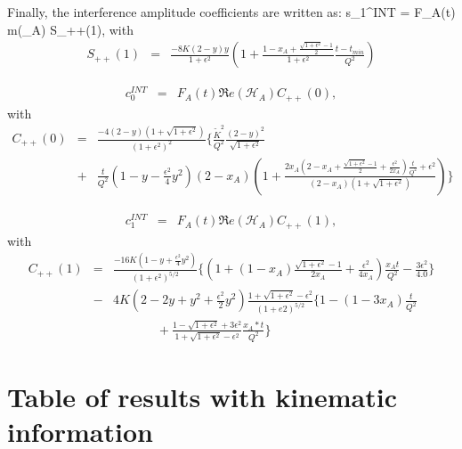 \documentclass{article}
\let\oldequation\equation
\let\oldendequation\endequation
\renewenvironment{equation}
  {\linenomathNonumbers\oldequation}
  {\oldendequation\endlinenomath}
\begin{document}
Finally, the interference amplitude coefficients are written as:
\begin{equation}
s_{1}^{INT} = F_{A}(t) \Im m(_{A}) S_{++}(1),
\end{equation}
with
\begin{eqnarray}
   S_{++}(1) &=& \frac{-8K(2-y)y}{1+\epsilon^2} \left( 1 + 
\frac{1-x_A+\frac{\sqrt{1+\epsilon^2}-1}{2}}{1+\epsilon^2} 
\frac{t-t_{min}}{Q^{2}} \right) \label{eq:s1I}
\end{eqnarray}

\begin{eqnarray}
c_0^{INT} &=& F_A(t) \Re e(\mathcal{H}_{A}) C_{++}(0),
\end{eqnarray}
with \begin{eqnarray}  C_{++}(0) &=&
\frac{-4(2-y)(1+\sqrt{1+\epsilon^{2}})}{(1+\epsilon^{2})^2}  \bigg\{ 
   \frac{\widetilde{K}^2}{Q^2}  \frac{(2-y)^2}{\sqrt{1+\epsilon^{2}}} \, \\
   &+& \frac{t}{Q^2}  \left( 1 - y - \frac{\epsilon^2}{4} y^2 \right)  
(2-x_{A}) \left(  1 + \frac{2x_A(2-x_A + \frac{\sqrt{1+\epsilon^{2}}-1}{2} + 
\frac{\epsilon^{2}}{2x_A})\frac{t}{Q^2} + \epsilon^{2}}{(2-x_A) 
(1+\sqrt{1+\epsilon^{2}})}  \right)  \bigg\} \nonumber
 \label{eq:c0I} 
 \end{eqnarray}

\begin{eqnarray}
   c_1^{INT} &=&  F_A(t) \Re e(\mathcal{H}_{A}) C_{++}(1),
\end{eqnarray}
with  
   \begin{eqnarray}
   C_{++}(1) &=&
   \frac{-16K(1-y+\frac{\epsilon^{2}}{4}y^2)}{(1+\epsilon^{2})^{5/2}}\bigg\{\left(1+(1-x_A)\frac{\sqrt{1+\epsilon^{2}}-1}{2x_A} 
   + \frac{\epsilon^{2}}{4x_A}\right) 
\frac{x_At}{Q^2}-\frac{3\epsilon^{2}}{4.0} \bigg\} \nonumber \\&-& 4K \left( 
2-2y+y^2+\frac{\epsilon^{2}}{2}y^2\right)\frac{1+\sqrt{1+\epsilon^{2}}-\epsilon^{2}}{(1+e2)^{5/2}}\bigg\{1-(1-3x_A)\frac{t}{Q^2}\nonumber\\&\,\,\,\,&\,\,\,\,\,\,\,\,\,\,\,\,\,\,\,\,\,\,\,\,\,+\frac{1-\sqrt{1+\epsilon^{2}}+3\epsilon^{2}}{1+\sqrt{1+\epsilon^{2}}-\epsilon^{2}} 
\frac{x_A*t}{Q^2}\bigg\} \label{eq:c1I}
\end{eqnarray}


\section{Table of results with kinematic information}
\label{sec:fullresults}
\end{document}
